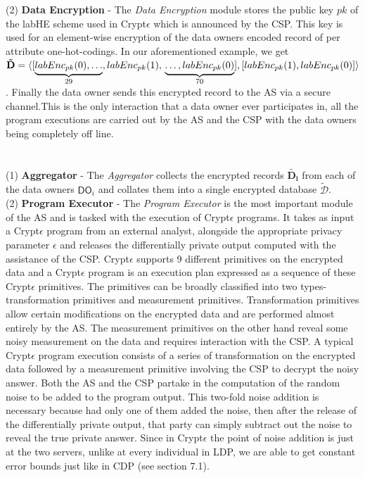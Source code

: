 (2)\textbf{ Data Encryption} - The \textit{Data Encryption} module stores the public key $pk$ of the labHE scheme used in Crypt$\epsilon$ which is announced by the CSP. This key is used for an element-wise encryption of the data owners encoded record of per attribute one-hot-codings. In our aforementioned example, we get $\mathbf{\tilde{D}}=\langle[\underbrace{labEnc_{pk}(0),\ldots}_{29},labEnc_{pk}(1),\\\underbrace{\ldots,labEnc_{pk}(0)}_{70}],
[labEnc_{pk}(1),labEnc_{pk}(0)]\rangle$. Finally the data owner sends this encrypted record to the \textsf{AS} via a secure channel.This is the only interaction that a data owner ever participates in, all the program executions are carried out by the \textsf{AS} and the \textsf{CSP} with the data owners being completely off line.\\\\
\\
(1)\textbf{  Aggregator} - The \textit{Aggregator} collects the encrypted records $\mathbf{\tilde{D_i}}$ from each of the data owners $\textsf{DO}_i$ and collates them into a single encrypted database $\boldsymbol{\tilde{\mathcal{D}}}$. %
\\(2)\textbf{ Program Executor }- The \textit{Program Executor} is the most important module of the \textsf{AS} and is tasked with the execution of Crypt$\epsilon$ programs. It takes as input a Crypt$\epsilon$ program from an external analyst, alongside the appropriate privacy parameter $\epsilon$ and releases the differentially private output computed with the assistance of the \textsf{CSP}. Crypt$\epsilon$ supports 9 different primitives on the encrypted data and a Crypt$\epsilon$ program is an execution plan expressed as a sequence of these Crypt$\epsilon$ primitives. The primitives can be broadly classified into two types- transformation primitives and measurement primitives. Transformation primitives allow certain modifications on the encrypted data and are performed almost entirely by the \textsf{AS}. The measurement primitives on the other hand reveal some noisy measurement on the data and requires interaction with the \textsf{CSP}. A typical Crypt$\epsilon$ program execution consists of  a series of transformation on the encrypted data followed by a measurement primitive involving the \textsf{CSP} to decrypt the noisy answer. Both the \textsf{AS} and the \textsf{CSP} partake in the computation of the random noise to be added to the program output. This two-fold noise addition is necessary because  had only one of them added the noise, then after the release of the differentially private output, that party can simply subtract out the noise to reveal the true private answer. Since in Crypt$\epsilon$ the point of noise addition is just at the two servers, unlike at every individual in \textsf{LDP}, we are able to get constant error bounds just like in \textsf{CDP} (see section 7.1). 
